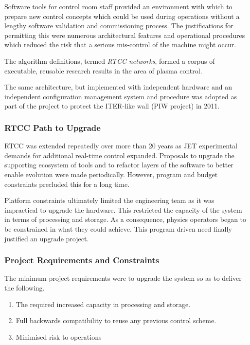 \documentclass[preprint,12pt]{elsarticle}
\begin{document}
Software tools for control room staff provided an environment with
which to prepare new control concepts which could be used during operations
without a lengthy software validation and commissioning process.
The justifications for permitting this were numerous architectural
features and operational procedures which reduced the risk that a 
serious mis-control of the machine might occur.

The algorithm definitions, termed {\em RTCC networks}, formed a corpus
of executable, reusable research results in the area of plasma control.

The same architecture, but implemented with independent hardware
and an independent configuration management system and procedure 
was adopted as part of the project to protect the ITER-like wall
(PIW project) in 2011.

\subsubsection{RTCC Path to Upgrade}

RTCC was extended repeatedly over more than 20 years as JET
experimental demands for additional real-time control expanded.
Proposals to upgrade the supporting ecosystem of tools
and to refactor layers of the software to better enable
evolution were made periodically.  However, program and budget
constraints precluded this for a long time.

Platform constraints ultimately limited the engineering
team as it was impractical to upgrade the hardware.
This restricted the capacity of the system in terms of
processing and storage.  As a consequence, physics operators
began to be constrained in what they could achieve.
This program driven need finally justified an upgrade
project.

\subsubsection{Project Requirements and Constraints}

The minimum project requirements were to 
upgrade the system so as to deliver the following.

\begin{enumerate}
	\item{The required increased capacity in processing and storage.}
	\item{Full backwards compatibility to reuse any previous control scheme.}
	\item{Minimised risk to operations}
\end{enumerate}
\end{document}
